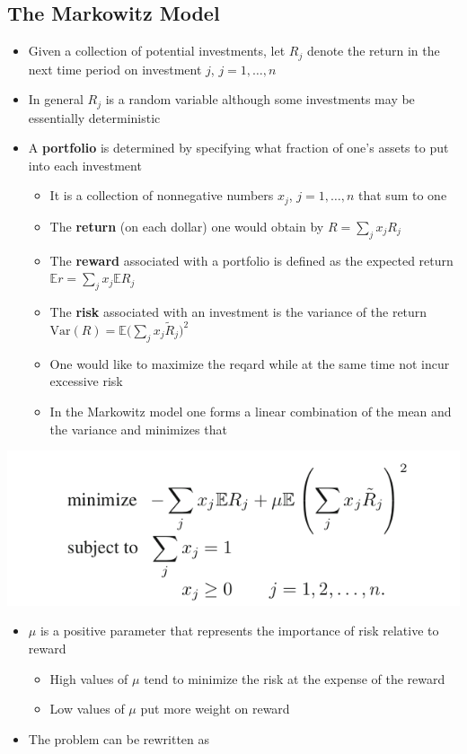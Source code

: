 \documentclass[11pt]{article}
\begin{document}
\subsection{The Markowitz Model}
\label{sec:org160af74}
\begin{itemize}
\item Given a collection of potential investments, let \(R_j\) denote the return in the next time period on investment \(j\), \(j=1,\dots,n\)
\item In general \(R_j\) is a random variable although some investments may be essentially deterministic
\item A \textbf{portfolio} is determined by specifying what fraction of one's assets to put into each investment
\begin{itemize}
\item It is a collection of nonnegative numbers \(x_j\), \(j=1,\dots,n\) that sum to one
\item The \textbf{return} (on each dollar) one would obtain by \(R=\sum_j x_jR_j\)
\item The \textbf{reward} associated with a portfolio is defined as the expected return \(\mathbb E r = \sum_j x_j \mathbb E R_j\)
\item The \textbf{risk} associated with an investment is the variance of the return \(\text{Var}(R) = \mathbb E \bigg (\sum_j x_j \tilde R_j \bigg)^2\)
\item One would like to maximize the reqard while at the same time not incur excessive risk
\item In the Markowitz model one forms a linear combination of the mean and the variance and minimizes that
\end{itemize}
\end{itemize}
\begin{center}
\includegraphics[width=.9\linewidth]{Quadratic Programming/screenshot_2019-03-17_14-26-41.png}
\end{center}
\begin{itemize}
\item \(\mu\) is a positive parameter that represents the importance of risk relative to reward
\begin{itemize}
\item High values of \(\mu\) tend to minimize the risk at the expense of the reward
\item Low values of \(\mu\) put more weight on reward
\end{itemize}

\item The problem can be rewritten as
\end{itemize}
\end{document}

